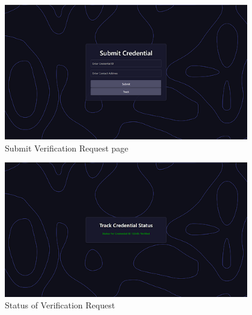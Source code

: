 \begin{figure}
    \begin{center}
        \includegraphics[width=0.95\textwidth]{img/verification_req.png}
    \end{center}
    \caption{Submit Verification Request page}\label{fig:verification_req}
\end{figure}

\begin{figure}
    \begin{center}
        \includegraphics[width=0.95\textwidth]{img/status_verify.png}
    \end{center}
    \caption{Status of Verification Request}\label{fig:verification_status}
\end{figure}


